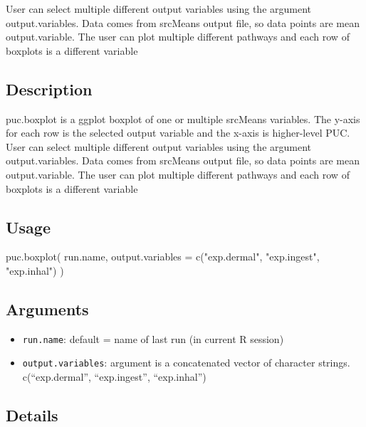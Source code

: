 \documentclass[
]{article}
\newenvironment{Shaded}{\begin{snugshade}}{\end{snugshade}}
\newcommand{\AttributeTok}[1]{\textcolor[rgb]{0.77,0.63,0.00}{#1}}
\newcommand{\FunctionTok}[1]{\textcolor[rgb]{0.00,0.00,0.00}{#1}}
\newcommand{\NormalTok}[1]{#1}
\newcommand{\StringTok}[1]{\textcolor[rgb]{0.31,0.60,0.02}{#1}}
\providecommand{\tightlist}{%
  \setlength{\itemsep}{0pt}\setlength{\parskip}{0pt}}
\begin{document}
User can select multiple different output variables using the argument
output.variables. Data comes from srcMeans output file, so data points
are mean output.variable. The user can plot multiple different pathways
and each row of boxplots is a different variable

\hypertarget{description-32}{%
\subsection{Description}\label{description-32}}

puc.boxplot is a ggplot boxplot of one or multiple srcMeans variables.
The y-axis for each row is the selected output variable and the x-axis
is higher-level PUC. User can select multiple different output variables
using the argument output.variables. Data comes from srcMeans output
file, so data points are mean output.variable. The user can plot
multiple different pathways and each row of boxplots is a different
variable

\hypertarget{usage-32}{%
\subsection{Usage}\label{usage-32}}

\begin{Shaded}
\begin{Highlighting}[]
\FunctionTok{puc.boxplot}\NormalTok{(}
\NormalTok{  run.name,}
  \AttributeTok{output.variables =} \FunctionTok{c}\NormalTok{(}\StringTok{"exp.dermal"}\NormalTok{, }\StringTok{"exp.ingest"}\NormalTok{, }\StringTok{"exp.inhal"}\NormalTok{)}
\NormalTok{)}
\end{Highlighting}
\end{Shaded}

\hypertarget{arguments-29}{%
\subsection{Arguments}\label{arguments-29}}

\begin{itemize}
\tightlist
\item
  \texttt{run.name}: default = name of last run (in current R session)
\item
  \texttt{output.variables}: argument is a concatenated vector of
  character strings. c(``exp.dermal'', ``exp.ingest'', ``exp.inhal'')
\end{itemize}

\hypertarget{details-22}{%
\subsection{Details}\label{details-22}}
\end{document}

